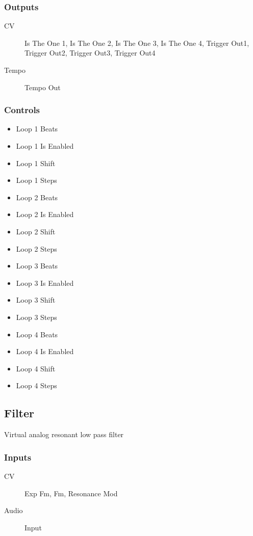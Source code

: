 \subsubsection{Outputs}
\begin{description}
\item [CV] Is The One 1, Is The One 2, Is The One 3, Is The One 4, Trigger Out1, Trigger Out2, Trigger Out3, Trigger Out4
\item [Tempo] Tempo Out
\end{description}

\subsubsection{Controls}
\begin{itemize}
\item Loop 1 Beats
\item Loop 1 Is Enabled
\item Loop 1 Shift
\item Loop 1 Steps
\item Loop 2 Beats
\item Loop 2 Is Enabled
\item Loop 2 Shift
\item Loop 2 Steps
\item Loop 3 Beats
\item Loop 3 Is Enabled
\item Loop 3 Shift
\item Loop 3 Steps
\item Loop 4 Beats
\item Loop 4 Is Enabled
\item Loop 4 Shift
\item Loop 4 Steps
\end{itemize}

\subsection{Filter}

Virtual analog resonant low pass filter



\subsubsection{Inputs}
\begin{description}
\item [CV] Exp Fm, Fm, Resonance Mod
\item [Audio] Input
\end{description}

